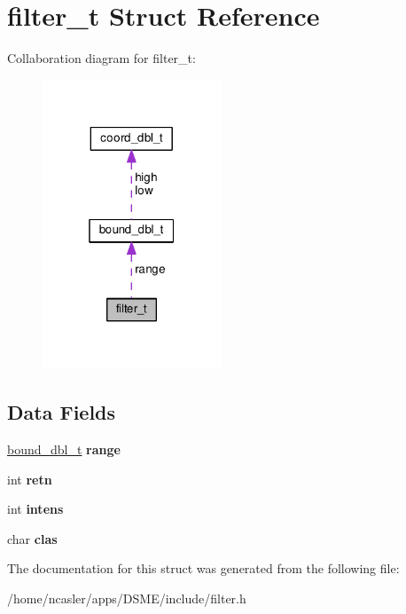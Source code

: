 \hypertarget{structfilter__t}{}\section{filter\+\_\+t Struct Reference}
\label{structfilter__t}


Collaboration diagram for filter\+\_\+t\+:\nopagebreak
\begin{figure}[H]
\begin{center}
\leavevmode
\includegraphics[width=151pt]{dd/d67/structfilter__t__coll__graph}
\end{center}
\end{figure}
\subsection*{Data Fields}
\begin{DoxyCompactItemize}
\item 
\hypertarget{structfilter__t_a16b5a1d44749075caf726bf69a9b5eb5}{}\hyperlink{structbound__dbl__t}{bound\+\_\+dbl\+\_\+t} {\bfseries range}\label{structfilter__t_a16b5a1d44749075caf726bf69a9b5eb5}

\item 
\hypertarget{structfilter__t_a662b0905cd8cad1213d96b1a1d5b73e4}{}int {\bfseries retn}\label{structfilter__t_a662b0905cd8cad1213d96b1a1d5b73e4}

\item 
\hypertarget{structfilter__t_a0e2b54faead36d94f5e00c16388a8d4c}{}int {\bfseries intens}\label{structfilter__t_a0e2b54faead36d94f5e00c16388a8d4c}

\item 
\hypertarget{structfilter__t_acf49d1c252a6444f920ed7c18e5081ea}{}char {\bfseries clas}\label{structfilter__t_acf49d1c252a6444f920ed7c18e5081ea}

\end{DoxyCompactItemize}


The documentation for this struct was generated from the following file\+:\begin{DoxyCompactItemize}
\item 
/home/ncasler/apps/\+D\+S\+M\+E/include/filter.\+h\end{DoxyCompactItemize}
